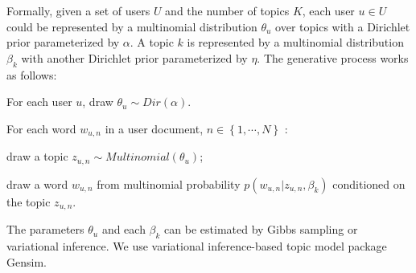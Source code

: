 \documentclass[preprint,times]{elsarticle}
\begin{document}
Formally, given a set of users $ U $ and the number of topics $ K $, each user $ u \in U $ could be represented by a multinomial distribution $ \theta_{u} $ over topics with a Dirichlet prior parameterized by $ \alpha $. 
A topic $ k $ is represented by a multinomial distribution $ \beta_{k} $ with another Dirichlet prior parameterized by $ \eta $. 
The generative process works as follows:
\begin{itemize*}
\item For each user $ u $, draw $ \theta_{u} \sim Dir \left(  \alpha \right) $.
\item For each word $ w_{u,n} $ in a user document, $ n \in \left\lbrace 1, \cdots, N \right\rbrace $ :
\begin{itemize*}
\item draw a topic $ z_{u,n} \sim Multinomial \left( \theta_{u}  \right) $;
\item draw a word $ w_{u,n} $ from multinomial probability $  p \left( w_{u,n} \vert z_{u,n}, \beta_{k}  \right) $ conditioned on the topic $ z_{u,n} $.
\end{itemize*}
\end{itemize*}
The parameters $ \theta_{u} $ and each $ \beta_{k} $ can be estimated by Gibbs sampling or variational inference.
We use variational inference-based topic model package Gensim\cite{rehurek_lrec}.
\end{document}
